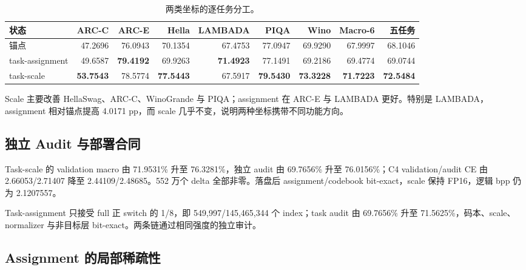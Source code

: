 \begin{table}[t]
\centering
\caption{两类坐标的逐任务分工。}
\label{tab:tasks_v8}
\begin{tabular}{lrrrrrrrr}
\toprule
状态 & ARC-C & ARC-E & Hella & LAMBADA & PIQA & Wino & Macro-6 & 五任务\\
\midrule
锚点 & 47.2696 & 76.0943 & 70.1354 & 67.4753 & 77.0947 & 69.9290 & 67.9997 & 68.1046\\
task-assignment & 49.6587 & \textbf{79.4192} & 69.9263 & \textbf{71.4923} & 77.1491 & 69.2186 & 69.4774 & 69.0744\\
task-scale & \textbf{53.7543} & 78.5774 & \textbf{77.5443} & 67.5917 & \textbf{79.5430} & \textbf{73.3228} & \textbf{71.7223} & \textbf{72.5484}\\
\bottomrule
\end{tabular}
\end{table}

Scale 主要改善 HellaSwag、ARC-C、WinoGrande 与 PIQA；assignment 在 ARC-E 与 LAMBADA 更好。特别是 LAMBADA，assignment 相对锚点提高 4.0171 pp，而 scale 几乎不变，说明两种坐标携带不同功能方向。

\subsection{独立 Audit 与部署合同}

Task-scale 的 validation macro 由 71.9531\% 升至 76.3281\%，独立 audit 由 69.7656\% 升至 76.0156\%；C4 validation/audit CE 由 2.66053/2.71407 降至 2.44109/2.48685。552 万个 delta 全部非零。落盘后 assignment/codebook bit-exact，scale 保持 FP16，逻辑 bpp 仍为 2.1207557。

Task-assignment 只接受 full 正 switch 的 1/8，即 549,997/145,465,344 个 index；task audit 由 69.7656\% 升至 71.5625\%，码本、scale、normalizer 与非目标层 bit-exact。两条链通过相同强度的独立审计。

\subsection{Assignment 的局部稀疏性}

\begin{table}[t]
\centering
\caption{当前码字附近领域的嵌套硬投影。}
\label{tab:projection_v8}
\end{table}

